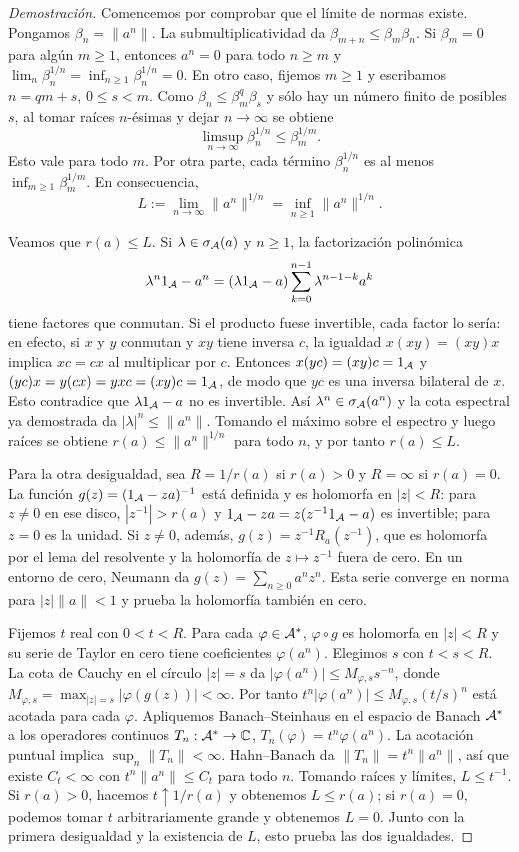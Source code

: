 \begin{proof}[Demostración]
Comencemos por comprobar que el límite de normas existe. Pongamos
$\beta_n=\|a^n\|$. La submultiplicatividad da
$\beta_{m+n}\le\beta_m\beta_n$. Si $\beta_m=0$ para algún
$m\ge1$, entonces $a^n=0$ para todo $n\ge m$ y
$\lim_n\beta_n^{1/n}=\inf_{n\ge1}\beta_n^{1/n}=0$.
En otro caso, fijemos $m\ge1$ y escribamos $n=qm+s$,
$0\le s<m$. Como
$\beta_n\le\beta_m^q\beta_s$ y sólo hay un número finito de
posibles $s$, al tomar raíces $n$-ésimas y dejar $n\to\infty$
se obtiene
\[
 \limsup_{n\to\infty}\beta_n^{1/n}\le\beta_m^{1/m}.
\]
Esto vale para todo $m$. Por otra parte, cada término
$\beta_n^{1/n}$ es al menos $\inf_{m\ge1}\beta_m^{1/m}$.
En consecuencia,
\[
 L:=\lim_{n\to\infty}\|a^n\|^{1/n}
   =\inf_{n\ge1}\|a^n\|^{1/n}.
\]

Veamos que $r(a)\le L$. Si $\lambda\in\sigma_\mathcal A(a)$ y
$n\ge1$, la factorización polinómica
\[
 \lambda^n1_\mathcal A-a^n
 =(\lambda1_\mathcal A-a)
   \sum_{k=0}^{n-1}\lambda^{n-1-k}a^k
 \]
tiene factores que conmutan. Si el producto fuese invertible, cada
factor lo sería: en efecto, si $x$ y $y$ conmutan y $xy$ tiene
inversa $c$, la igualdad $x(xy)=(xy)x$ implica $xc=cx$ al
multiplicar por $c$. Entonces
$x(yc)=(xy)c=1_\mathcal A$ y
$(yc)x=y(cx)=yx c=(xy)c=1_\mathcal A$, de modo que $yc$ es
una inversa bilateral de $x$.
Esto contradice que $\lambda1_\mathcal A-a$ no es invertible. Así
$\lambda^n\in\sigma_\mathcal A(a^n)$ y la cota espectral ya demostrada da
$|\lambda|^n\le\|a^n\|$. Tomando el máximo sobre el espectro
y luego raíces se obtiene $r(a)\le\|a^n\|^{1/n}$ para todo
$n$, y por tanto $r(a)\le L$.

Para la otra desigualdad, sea $R=1/r(a)$ si $r(a)>0$ y
$R=\infty$ si $r(a)=0$. La función
$g(z)=(1_\mathcal A-za)^{-1}$ está definida y es holomorfa en
$|z|<R$: para $z\ne0$ en ese disco,
$|z^{-1}|>r(a)$ y
$1_\mathcal A-za=z(z^{-1}1_\mathcal A-a)$ es invertible; para $z=0$
es la unidad. Si $z\ne0$, además,
$g(z)=z^{-1}R_a(z^{-1})$, que es holomorfa por el lema del
resolvente y la holomorfía de $z\mapsto z^{-1}$ fuera de cero.
En un entorno de cero, Neumann da
$g(z)=\sum_{n\ge0}a^nz^n$.
Esta serie converge en norma para $|z|\|a\|<1$ y prueba la
holomorfía también en cero.

Fijemos $t$ real con $0<t<R$. Para cada $\varphi\in\mathcal A^*$,
$\varphi\circ g$ es holomorfa en $|z|<R$ y su serie de Taylor
en cero tiene coeficientes $\varphi(a^n)$. Elegimos $s$ con
$t<s<R$. La cota de Cauchy en el círculo $|z|=s$ da
$|\varphi(a^n)|\le M_{\varphi,s}s^{-n}$, donde
$M_{\varphi,s}=\max_{|z|=s}|\varphi(g(z))|<\infty$.
Por tanto $t^n|\varphi(a^n)|\le M_{\varphi,s}(t/s)^n$ está
acotada para cada $\varphi$. Apliquemos Banach--Steinhaus en el espacio de Banach
$\mathcal A^*$ a los operadores continuos
$T_n:\mathcal A^*\to\mathbb C$,
$T_n(\varphi)=t^n\varphi(a^n)$. La acotación puntual implica
$\sup_n\|T_n\|<\infty$. Hahn--Banach da
$\|T_n\|=t^n\|a^n\|$, así que existe $C_t<\infty$ con
$t^n\|a^n\|\le C_t$ para todo $n$. Tomando raíces y límites,
$L\le t^{-1}$. Si $r(a)>0$, hacemos $t\uparrow1/r(a)$ y
obtenemos $L\le r(a)$; si $r(a)=0$, podemos tomar $t$
arbitrariamente grande y obtenemos $L=0$. Junto con la primera
desigualdad y la existencia de $L$, esto prueba las dos igualdades.
\end{proof}

